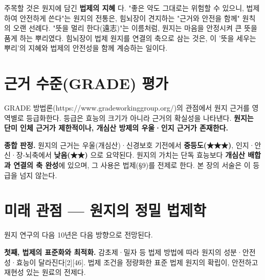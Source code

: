 \documentclass[11pt,oneside]{book}
\begin{document}
주목할 것은 원지에 담긴 \textbf{법제의 지혜} 다. "좋은 약도 그대로는 위험할 수 있으니, 법제하여 안전하게 쓴다"는 원지의 전통은, 힘뇌장이 견지하는 "근거와 안전을 함께" 원칙의 오랜 선례다. "뜻을 멀리 한다(遠志)"는 이름처럼, 원지는 마음을 안정시켜 큰 뜻을 품게 하는 뿌리였다. 힘뇌장이 법제 원지를 연결의 축으로 삼는 것은, 이 '뜻을 세우는 뿌리'의 지혜와 법제의 안전성을 함께 계승하는 일이다.

\section{근거 수준(GRADE) 평가}
GRADE 방법론(https://www.gradeworkinggroup.org/)의 관점에서 원지 근거를 영역별로 등급화한다. 등급은 효능의 크기가 아니라 근거의 확실성을 나타낸다. \textbf{원지는 단미 인체 근거가 제한적이나, 개심산 방제의 우울·인지 근거가 존재한다.}

\vspace{2pt}\vspace{3pt}

\textbf{종합 판정.} 원지의 근거는 우울(개심산)·신경보호 기전에서 \textbf{중등도(★★★)}, 인지·안신·장-뇌축에서 \textbf{낮음(★★)} 으로 요약된다. 원지의 가치는 단독 효능보다 \textbf{개심산 배합과 연결의 축 완성}에 있으며, 그 사용은 법제(§9)를 전제로 한다. 본 장의 서술은 이 등급을 넘지 않는다.

\section{미래 관점 — 원지의 정밀 법제학}
원지 연구의 다음 10년은 다음 방향으로 전망된다.

\textbf{첫째, 법제의 표준화와 최적화.} 감초제·밀자 등 법제 방법에 따라 원지의 성분·안전성·효능이 달라진다[2][46]. 법제 조건을 정량화한 표준 법제 원지의 확립이, 안전하고 재현성 있는 원료의 전제다.
\end{document}
